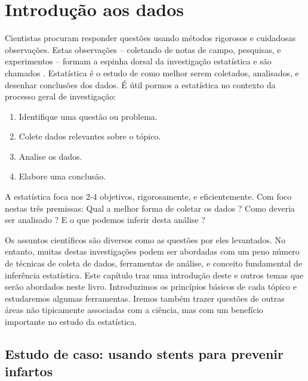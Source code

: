 \chapter{Introdução aos dados}
\label{introductionToData}


Cientistas procuram responder questões usando métodos rigorosos e cuidadosas observações. Estas observações -- coletando de notas de campo, pesquisas, e experimentos -- formam a espinha dorsal da investigação estatística e são chamados . Estatística é o estudo de como melhor serem coletados, analisados, e desenhar conclusões dos dados. É útil pormos a estatística no contexto da processo geral de investigação:
\begin{enumerate}
\setlength{\itemsep}{0mm}
\item Identifique uma questão ou problema.
\item Colete dados relevantes sobre o tópico.
\item Analise os dados.
\item Elabore uma conclusão.
\end{enumerate}
A estatística foca nos 2-4 objetivos, rigorosamente, e eficientemente. Com foco nestas três premissas: Qual a melhor forma de coletar os dados ? Como deveria ser analisado ? E o que podemos inferir desta análise ?

Os assuntos científicos são diversos como as questões por eles levantados. No entanto, muitas destas investigações podem ser abordadas com um peno número de técnicas de coleta de dados, ferramentas de análise, e conceito fundamental de inferência estatística. Este capítulo traz uma introdução deste e outros temas que serão abordados neste livro. Introduzimos os princípios básicos de cada tópico e estudaremos algumas ferramentas. Iremos também trazer questões de outras áreas não tipicamente associadas com a ciência, mas com um benefício importante no estudo da estatística.

\section[Estudo de caso: usando stents para prevenir infartos]{Estudo de caso: usando stents para prevenir infartos }
\label{basicExampleOfStentsAndStrokes}

